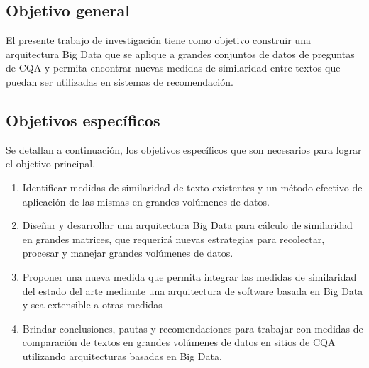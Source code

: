 \subsection{Objetivo general}
El presente trabajo de investigación tiene como objetivo construir una arquitectura Big Data que se aplique a grandes conjuntos de datos de preguntas de CQA y permita encontrar nuevas medidas de similaridad entre textos que puedan ser utilizadas en sistemas de recomendación.

\subsection{Objetivos específicos}
Se detallan a continuación, los objetivos específicos que son necesarios para lograr el objetivo principal.
\begin{enumerate}
	\item Identificar medidas de similaridad de texto existentes y un método efectivo de aplicación de las mismas en grandes volúmenes de datos.
	\item Diseñar y desarrollar una arquitectura Big Data para cálculo de similaridad en grandes matrices, que requerirá nuevas estrategias para recolectar, procesar y manejar grandes volúmenes de datos.
	\item Proponer una nueva medida que permita integrar las medidas de similaridad del estado del arte mediante una arquitectura de software basada en Big Data y sea extensible a otras medidas
	\item Brindar conclusiones, pautas y recomendaciones para trabajar con medidas de comparación de textos en grandes volúmenes de datos en sitios de CQA utilizando arquitecturas basadas en Big Data.
\end{enumerate}